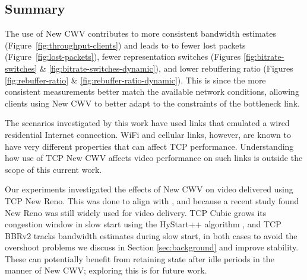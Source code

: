 \documentclass[10pt,sigconf]{acmart}
\begin{document}
\subsection{Summary}
\label{sec:summary}


The use of New CWV contributes to more consistent bandwidth estimates (Figure~\ref{fig:throughput-clients}) and leads to to fewer lost packets (Figure~\ref{fig:lost-packets}), fewer representation switches (Figures \ref{fig:bitrate-switches} \& \ref{fig:bitrate-switches-dynamic}), and lower rebuffering ratio (Figures \ref{fig:rebuffer-ratio} \& \ref{fig:rebuffer-ratio-dynamic}).
This is since the more consistent measurements better match the available network conditions, allowing clients using New CWV to better adapt to the constraints of the bottleneck link. 

The scenarios investigated by this work have used links that emulated a wired
residential Internet connection.  WiFi and cellular links, however, are known
to have very different properties that can affect TCP performance. Understanding
how use of TCP New CWV affects video performance on such links is outside the
scope of this current work.

Our experiments investigated the effects of New CWV on video delivered
using TCP New Reno. This was done to align with
\cite{Nazir-2014-performance-evaluation-congestion-window-validation-dash-newcwv},
and because a recent study \cite{Mishra-2019-the-great-internet-tcp-congestion-control-census}
found New Reno was still widely used for video delivery.
%
TCP Cubic grows its congestion window in slow start using the HyStart++
algorithm \cite{draft-ietf-tcpm-hystartplusplus}, and TCP BBRv2 tracks
bandwidth estimates during slow start, in both cases to avoid the overshoot
problems we discuss in Section \ref{sec:background} and improve stability.
These can potentially benefit from retaining state after idle periods in
the manner of New CWV; exploring this is for future work.
\end{document}
